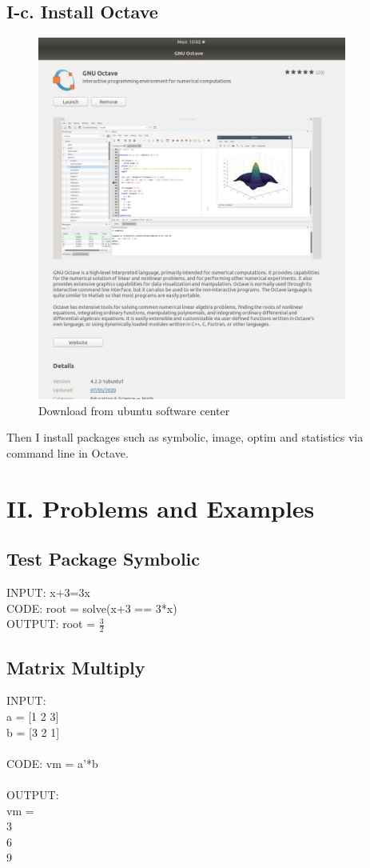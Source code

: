 \documentclass[twoside,a4paper]{article}
\begin{document}
\subsection*{I-c. Install Octave}
\begin{figure}[ht]
\centering
\includegraphics[width=4in]{octave.jpeg}
\caption{Download from ubuntu software center}
\end{figure}
\vbox{}\vbox{}\vbox{}\vbox{}\vbox{}
Then I install packages such as symbolic, image, optim and statistics via command line in Octave.

\section*{II. Problems and Examples}
\subsection*{Test Package Symbolic}
\large INPUT: x+3=3x \\
\large CODE: root = solve(x+3 == 3*x)\\
\large OUTPUT: root = $\frac{3}{2}$\\
\subsection*{Matrix Multiply}
\large INPUT: \\
a = [1 2 3]\\
b = [3 2 1]\\
\\
\large CODE: vm = a'*b\\
\\
\large OUTPUT: \\
vm =\\
     3   \\
     6   \\
     9  \\
\end{document}
